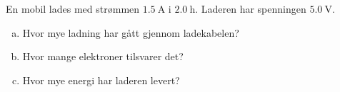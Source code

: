 %
En mobil lades med strømmen $\SI{1.5}{\ampere}$ i $\SI{2.0}{\hour}$. Laderen har spenningen $\SI{5.0}{\volt}$.
\begin{enumerate}[a)]
    \item Hvor mye ladning har gått gjennom ladekabelen?
    \item Hvor mange elektroner tilsvarer det?
    \item Hvor mye energi har laderen levert?
\end{enumerate}
%
